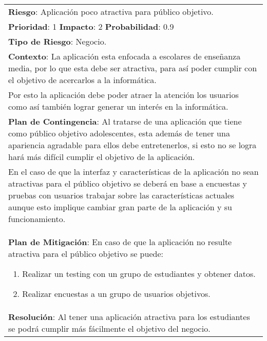 \begin{table}[htbp!]
  \begin{tabular}{|p{15cm}|}\hline
    {\bf Riesgo}: Aplicaci\'on poco atractiva para p\'ublico objetivo.\\%
    {\bf Prioridad}: 1  {\bf Impacto}: 2  {\bf Probabilidad}: 0.9\\%
    {\bf Tipo de Riesgo}: Negocio.\\%
    {\bf Contexto}: La aplicaci\'on esta enfocada a escolares de ense\~nanza media, por lo que esta debe ser atractiva, para as\'i poder cumplir con el objetivo de acercarlos a la inform\'atica.\\Por esto la aplicaci\'on debe poder atraer la atenci\'on los usuarios como as\'i tambi\'en lograr generar un inter\'es en la inform\'atica.\\%
    {\bf Plan de Contingencia}: Al tratarse de una aplicaci\'on que tiene como p\'ublico objetivo adolescentes, esta adem\'as de tener una apariencia agradable para ellos debe entretenerlos, si esto no se logra har\'a m\'as dif\'icil cumplir el objetivo de la aplicaci\'on.\\En el  caso de que la interfaz y caracter\'isticas de la aplicaci\'on no sean atractivas para el p\'ublico objetivo se deber\'a en base a encuestas y pruebas con usuarios trabajar sobre las caracter\'isticas actuales aunque esto implique cambiar gran parte de la aplicaci\'on y su funcionamiento.\\%
    {\bf Plan de Mitigaci\'on}: En caso de que la aplicaci\'on no resulte atractiva para el p\'ublico objetivo se puede:\begin{enumerate}\item Realizar un testing con un grupo de estudiantes y obtener datos.\item Realizar encuestas a un grupo de usuarios objetivos.\end{enumerate}\\%
    {\bf Resoluci\'on}: Al tener una aplicaci\'on atractiva para los estudiantes se podr\'a cumplir m\'as f\'acilmente el objetivo del negocio.
  \end{tabular}\\%
  \caption{}
  \label{table:R10}
\end{table}
